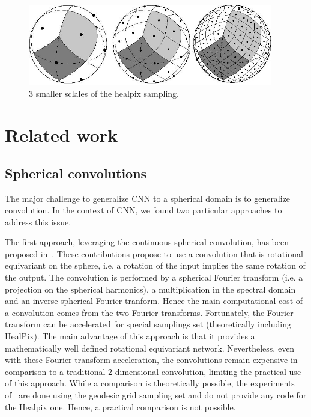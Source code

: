 \documentclass[preprint,12pt,authoryear]{elsarticle}
\begin{document}
\begin{figure}[!ht]
\centering
\includegraphics[width=0.95\textwidth]{figures/healpix-3layers.jpg}
\caption{3 smaller sclales of the healpix sampling.}
\label{fig:healpix_sampling}
\end{figure}

\section{Related work}
\label{sec:related}



\subsection{Spherical convolutions} 
The major challenge to generalize CNN to a
spherical domain is to generalize convolution. In the context of CNN, we found
two particular approaches to address this issue.

The first approach, leveraging the continuous spherical convolution, has been
proposed in~\cite{cohen2017convolutional,cohen2018spherical}. These
contributions propose to use a convolution that is rotational equivariant on the
sphere, i.e. a rotation of the input implies the same rotation of the output.
The convolution is performed by a spherical Fourier transform (i.e. a projection
on the spherical harmonics), a  multiplication in the spectral domain and an
inverse spherical Fourier tranform. Hence the main computational cost of a
convolution comes from the two Fourier transforms. Fortunately, the Fourier
transform can be accelerated for special samplings set (theoretically including
HealPix). The main advantage of this approach is that it provides a
mathematically well defined rotational equivariant network. Nevertheless, even
with these Fourier transform acceleration, the convolutions remain expensive in
comparison to a traditional 2-dimensional convolution, limiting the practical use of this
approach. While a comparison is theoretically possible, the experiments
of~\cite{cohen2018spherical} are done using the geodesic grid sampling set and
do not provide any code for the Healpix one. Hence, a practical comparison is
not possible.
\end{document}
